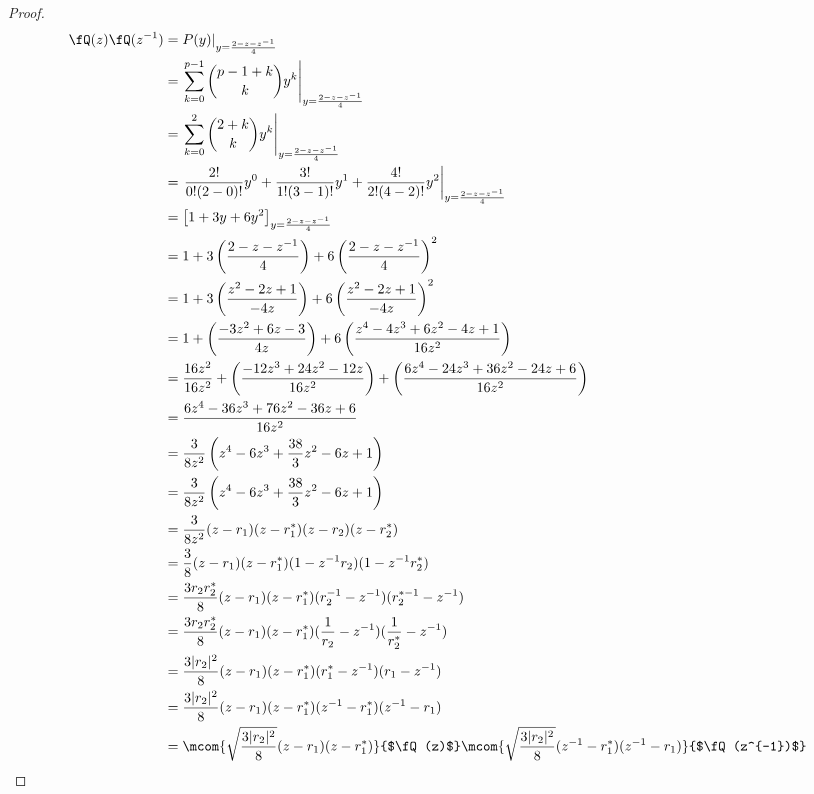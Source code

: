 \begin{proof}
\begin{align*}
  \fQ(z)\fQ(z^{-1})
    &= P(y)|_{y=\frac{2-z-z^{-1}}{4}}
  \\&= \left.
       \sum\limits_{k=0}^{p-1} {{p-1+k}\choose{k}} y^k
       \right|_{y=\frac{2-z-z^{-1}}{4}}
  \\&= \left.
       \sum\limits_{k=0}^{2} {{2+k}\choose{k}} y^k
       \right|_{y=\frac{2-z-z^{-1}}{4}}
  \\&= \left.
       \frac{2!}{0!(2-0)!}y^0 + \frac{3!}{1!(3-1)!}y^1 + \frac{4!}{2!(4-2)!}y^2
       \right|_{y=\frac{2-z-z^{-1}}{4}}
  \\&= \left[1 + 3y + 6y^2\right]_{y=\frac{2-z-z^{-1}}{4}}
  \\&=  1
      + 3\left(\frac{2-z-z^{-1}}{4}\right)
      + 6\left(\frac{2-z-z^{-1}}{4}\right)^2
  \\&=  1
      + 3\left(\frac{z^2-2z+1}{-4z}\right)
      + 6\left(\frac{z^2-2z+1}{-4z}\right)^2
  \\&=  1
      + \left(\frac{-3z^2+6z-3}{4z}\right)
      + 6\left(\frac{z^4 - 4z^3 + 6z^2 -4z +1}{16z^2}\right)
  \\&=  \frac{16z^2}{16z^2}
      + \left(\frac{-12z^3+24z^2-12z}{16z^2}\right)
      + \left(\frac{6z^4 - 24z^3 + 36z^2 -24z +6}{16z^2}\right)
  \\&=  \frac{6z^4 -36z^3 + 76z^2 -36z +6}{16z^2}
  \\&=  \frac{3}{8z^2}\left( z^4 -6z^3 + \frac{38}{3}z^2 -6z +1 \right)
  \\&=  \frac{3}{8z^2}\left( z^4 -6z^3 + \frac{38}{3}z^2 -6z +1 \right)
  \\&=  \frac{3}{8z^2}(z-r_1)(z-r_1^\ast)(z-r_2)(z-r_2^\ast)
  \\&=  \frac{3}{8}(z-r_1)(z-r_1^\ast)(1-z^{-1}r_2)(1-z^{-1}r_2^\ast)
  \\&=  \frac{3r_2r_2^\ast}{8}(z-r_1)(z-r_1^\ast)(r_2^{-1}-z^{-1})(r_2^{\ast-1}-z^{-1})
  \\&=  \frac{3r_2r_2^\ast}{8}(z-r_1)(z-r_1^\ast)(\frac{1}{r_2}-z^{-1})(\frac{1}{r_2^\ast}-z^{-1})
  \\&=  \frac{3|r_2|^2}{8}(z-r_1)(z-r_1^\ast)(r_1^\ast-z^{-1})(r_1-z^{-1})
  \\&=  \frac{3|r_2|^2}{8}(z-r_1)(z-r_1^\ast)(z^{-1}-r_1^\ast)(z^{-1}-r_1)
  \\&=  \mcom{\sqrt{\frac{3|r_2|^2}{8}}(z-r_1)(z-r_1^\ast)}{$\fQ(z)$}
        \mcom{\sqrt{\frac{3|r_2|^2}{8}}(z^{-1}-r_1^\ast)(z^{-1}-r_1)}{$\fQ(z^{-1})$}
\\

\end{align*}
\end{proof}
